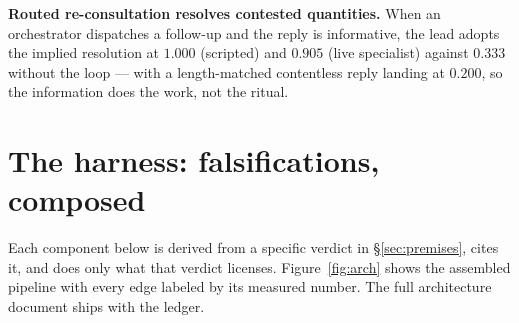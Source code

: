 \documentclass[11pt]{article}
\begin{document}
\textbf{Routed re-consultation resolves contested quantities.} When an
orchestrator dispatches a follow-up and the reply is informative, the
lead adopts the implied resolution at $1.000$ (scripted) and $0.905$
(live specialist) against $0.333$ without the loop --- with a
length-matched contentless reply landing at $0.200$, so the
information does the work, not the ritual.

\section{The harness: falsifications, composed}
\label{sec:harness}

Each component below is derived from a specific verdict in
\S\ref{sec:premises}, cites it, and does only what that verdict
licenses. Figure~\ref{fig:arch} shows the assembled pipeline with every
edge labeled by its measured number. The full architecture document
ships with the ledger.
\end{document}
